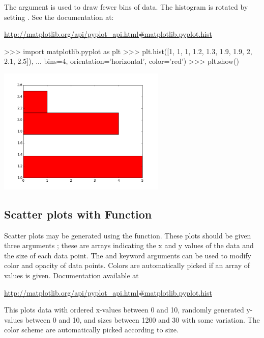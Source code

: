 \documentclass[11pt]{cselabheader}
\begin{document}
The  argument is used to draw fewer bins of
data. The histogram is rotated by setting
. See the documentation at:

\begin{center}
\url{http://matplotlib.org/api/pyplot_api.html#matplotlib.pyplot.hist}
\end{center}

\begin{pyconcode}
>>> import matplotlib.pyplot as plt
>>> plt.hist([1, 1, 1, 1.2, 1.3, 1.9, 1.9, 2, 2.1, 2.5]),
...          bins=4, orientation='horizontal', color='red')
>>> plt.show()
\end{pyconcode}

\begin{center}
\includegraphics[width=0.6\textwidth]{img/matplotlib_hist2.png}
\end{center}

\subsection{Scatter plots with  Function}

Scatter plots may be generated using the  function.
These plots should be given three arguments ; these are
arrays indicating the x and y values of the data and the size of each data point.
The  and  keyword arguments can be used to
modify color and opacity of data points. Colors are automatically picked if an
array of values is given. Documentation available at

\begin{center}
\url{http://matplotlib.org/api/pyplot_api.html#matplotlib.pyplot.hist}
\end{center}

This plots data with ordered x-values between 0 and 10, randomly generated
y-values between 0 and 10, and sizes between 1200 and 30 with some variation.
The color scheme are automatically picked according to size.
\end{document}
